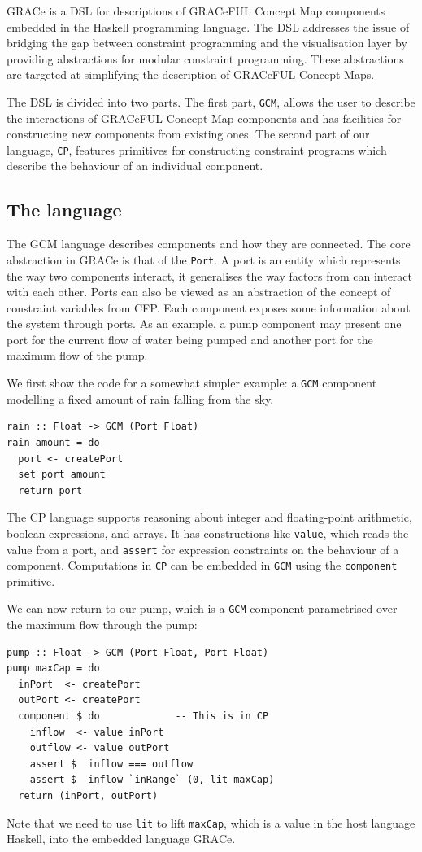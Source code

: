 GRACe is a DSL for
descriptions of GRACeFUL Concept Map components embedded in the
Haskell programming language.
%
The DSL addresses the issue of bridging the gap between constraint
programming and the visualisation layer by providing abstractions for
modular constraint programming.
%
These abstractions are targeted at simplifying the description of
GRACeFUL Concept Maps.

The DSL is divided into two parts.
%
The first part, \texttt{GCM}, allows the user to describe the
interactions of GRACeFUL Concept Map components and has facilities for
constructing new components from existing ones.
%
The second part of our language, \texttt{CP}, features primitives for constructing
constraint programs which describe the behaviour of an individual
component.

\subsection{The language}

The GCM language describes components and how they are connected.
%
The core abstraction in GRACe is that of the \texttt{Port}.
%
A port is an entity which represents the way two components interact,
it generalises the way factors from \cite{D4.1} can interact with each
other.
%
Ports can also be viewed as an abstraction of the concept of constraint
variables from CFP.
%
Each component exposes some information about the system through
ports.
%
As an example, a pump component may present one port for the current
flow of water being pumped and another port for the maximum flow of
the pump.

We first show the code for a somewhat simpler example: a \texttt{GCM}
component modelling a fixed amount of rain falling from the sky.
\begin{verbatim}
rain :: Float -> GCM (Port Float)
rain amount = do
  port <- createPort
  set port amount
  return port
\end{verbatim}

The CP language supports reasoning about integer and floating-point
arithmetic, boolean expressions, and arrays.
%
It has constructions like \texttt{value}, which reads the value from a
port, and \texttt{assert} for expression constraints on the behaviour
of a component.
%
Computations in \texttt{CP} can be embedded in \texttt{GCM} using the
\texttt{component} primitive.

We can now return to our pump, which is a \texttt{GCM} component
parametrised over the maximum flow through the pump:
%
\begin{verbatim}
pump :: Float -> GCM (Port Float, Port Float)
pump maxCap = do
  inPort  <- createPort
  outPort <- createPort
  component $ do             -- This is in CP
    inflow  <- value inPort
    outflow <- value outPort
    assert $  inflow === outflow
    assert $  inflow `inRange` (0, lit maxCap)
  return (inPort, outPort)
\end{verbatim}
%
Note that we need to use \texttt{lit} to lift \texttt{maxCap}, which
is a value in the host language Haskell, into the embedded language
GRACe.

